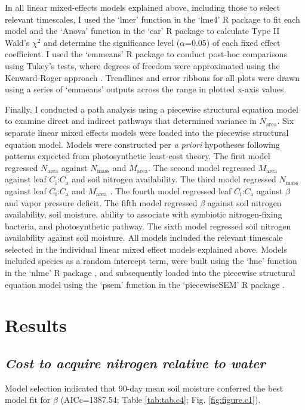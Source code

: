 In all linear mixed-effects models explained above, including those to select relevant timescales, I used the `lmer' function in the `lme4' R package  to fit each model and the `Anova' function in the `car' R package  to calculate Type II Wald's $\chi^2$ and determine the significance level ($\alpha$=0.05) of each fixed effect coefficient. I used the `emmeans' R package  to conduct post-hoc comparisons using Tukey's tests, where degrees of freedom were approximated using the Kenward-Roger approach . Trendlines and error ribbons for all plots were drawn using a series of `emmeans’ outputs across the range in plotted x-axis values.

Finally, I conducted a path analysis using a piecewise structural equation model to examine direct and indirect pathways that determined variance in $N_\mathrm{area}$. Six separate linear mixed effects models were loaded into the piecewise structural equation model. Models were constructed per \textit{a priori} hypotheses following patterns expected from photosynthetic least-cost theory. The first model regressed $N_\mathrm{area}$ against $N_\mathrm{mass}$ and $M_\mathrm{area}$. The second model regressed $M_\mathrm{area}$ against leaf $C_\mathrm{i}$:$C_\mathrm{a}$ and soil nitrogen availability. The third model regressed $N_\mathrm{mass}$ against leaf $C_\mathrm{i}$:$C_\mathrm{a}$ and $M_\mathrm{area}$ . The fourth model regressed leaf $C_\mathrm{i}$:$C_\mathrm{a}$ against $\beta$ and vapor pressure deficit. The fifth model regressed $\beta$ against soil nitrogen availability, soil moisture, ability to associate with symbiotic nitrogen-fixing bacteria, and photosynthetic pathway. The sixth model regressed soil nitrogen availability against soil moisture. All models included the relevant timescale selected in the individual linear mixed effect models explained above. Models included species as a random intercept term, were built using the `lme’ function in the `nlme’ R package , and subsequently loaded into the piecewise structural equation model using the `psem’ function in the `piecewiseSEM’ R package .
\clearpage

\newpage
\section{Results}
\subsection{\textit{Cost to acquire nitrogen relative to water}}
\noindent Model selection indicated that 90-day mean soil moisture conferred the best model fit for $\beta$ (AICc=1387.54; Table \ref{tab:tab.c4}; Fig. \ref{fig:figure.c1}).

